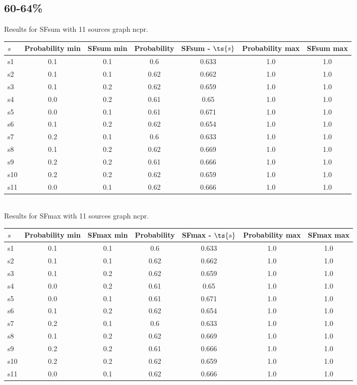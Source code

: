 \documentclass{article}
\begin{document}
\newpage

\subsection{60-64\%}

\noindent Results for SFsum with 11 sources graph ncpr.

\noindent\begin{tabular}{|l|c|c|c|c|c|c|}
\hline
$s$& Probability min & SFsum min & Probability & SFsum - $\ts{s}$ & Probability max & SFsum max\\
\hline
s1 &0.1 & 0.1 & 0.6 & 0.633 & 1.0 & 1.0\\
\hline
s2 &0.1 & 0.1 & 0.62 & 0.662 & 1.0 & 1.0\\
\hline
s3 &0.1 & 0.2 & 0.62 & 0.659 & 1.0 & 1.0\\
\hline
s4 &0.0 & 0.2 & 0.61 & 0.65 & 1.0 & 1.0\\
\hline
s5 &0.0 & 0.1 & 0.61 & 0.671 & 1.0 & 1.0\\
\hline
s6 &0.1 & 0.2 & 0.62 & 0.654 & 1.0 & 1.0\\
\hline
s7 &0.2 & 0.1 & 0.6 & 0.633 & 1.0 & 1.0\\
\hline
s8 &0.1 & 0.2 & 0.62 & 0.669 & 1.0 & 1.0\\
\hline
s9 &0.2 & 0.2 & 0.61 & 0.666 & 1.0 & 1.0\\
\hline
s10 &0.2 & 0.2 & 0.62 & 0.659 & 1.0 & 1.0\\
\hline
s11 &0.0 & 0.1 & 0.62 & 0.666 & 1.0 & 1.0\\
\hline
\end{tabular}\\

\noindent Results for SFmax with 11 sources graph ncpr.

\noindent\begin{tabular}{|l|c|c|c|c|c|c|}
\hline
$s$& Probability min & SFmax min & Probability & SFmax - $\ts{s}$ & Probability max & SFmax max\\
\hline
s1 &0.1 & 0.1 & 0.6 & 0.633 & 1.0 & 1.0\\
\hline
s2 &0.1 & 0.1 & 0.62 & 0.662 & 1.0 & 1.0\\
\hline
s3 &0.1 & 0.2 & 0.62 & 0.659 & 1.0 & 1.0\\
\hline
s4 &0.0 & 0.2 & 0.61 & 0.65 & 1.0 & 1.0\\
\hline
s5 &0.0 & 0.1 & 0.61 & 0.671 & 1.0 & 1.0\\
\hline
s6 &0.1 & 0.2 & 0.62 & 0.654 & 1.0 & 1.0\\
\hline
s7 &0.2 & 0.1 & 0.6 & 0.633 & 1.0 & 1.0\\
\hline
s8 &0.1 & 0.2 & 0.62 & 0.669 & 1.0 & 1.0\\
\hline
s9 &0.2 & 0.2 & 0.61 & 0.666 & 1.0 & 1.0\\
\hline
s10 &0.2 & 0.2 & 0.62 & 0.659 & 1.0 & 1.0\\
\hline
s11 &0.0 & 0.1 & 0.62 & 0.666 & 1.0 & 1.0\\
\hline
\end{tabular}\\
\end{document}
